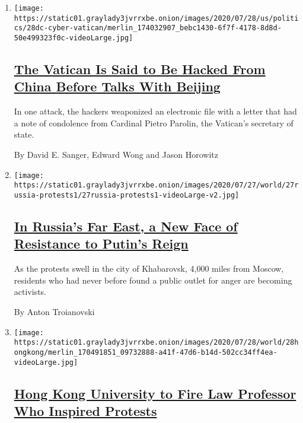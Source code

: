 \begin{enumerate}
\def\labelenumi{\arabic{enumi}.}
\item
  \texttt{[image: https://static01.graylady3jvrrxbe.onion/images/2020/07/28/us/politics/28dc-cyber-vatican/merlin\_174032907\_bebc1430-6f7f-4178-8d8d-50e499323f0c-videoLarge.jpg]}

  \hypertarget{the-vatican-is-said-to-be-hacked-from-china-before-talks-with-beijing}{%
  \subsection{\texorpdfstring{\href{/2020/07/28/us/politics/china-vatican-hack.html}{The
  Vatican Is Said to Be Hacked From China Before Talks With
  Beijing}}{The Vatican Is Said to Be Hacked From China Before Talks With Beijing}}\label{the-vatican-is-said-to-be-hacked-from-china-before-talks-with-beijing}}

  In one attack, the hackers weaponized an electronic file with a letter
  that had a note of condolence from Cardinal Pietro Parolin, the
  Vatican's secretary of state.

  By David E. Sanger, Edward Wong and Jason Horowitz
\item
  \texttt{[image: https://static01.graylady3jvrrxbe.onion/images/2020/07/27/world/27russia-protests1/27russia-protests1-videoLarge-v2.jpg]}

  \hypertarget{in-russias-far-east-a-new-face-of-resistance-to-putins-reign}{%
  \subsection{\texorpdfstring{\href{/2020/07/28/world/europe/russias-far-east-protests-putin.html}{In
  Russia's Far East, a New Face of Resistance to Putin's
  Reign}}{In Russia's Far East, a New Face of Resistance to Putin's Reign}}\label{in-russias-far-east-a-new-face-of-resistance-to-putins-reign}}

  As the protests swell in the city of Khabarovsk, 4,000 miles from
  Moscow, residents who had never before found a public outlet for anger
  are becoming activists.

  By Anton Troianovski
\item
  \texttt{[image: https://static01.graylady3jvrrxbe.onion/images/2020/07/28/world/28hongkong/merlin\_170491851\_09732888-a41f-47d6-b14d-502cc34ff4ea-videoLarge.jpg]}

  \hypertarget{hong-kong-university-to-fire-law-professor-who-inspired-protests}{%
  \subsection{\texorpdfstring{\href{/2020/07/28/world/asia/benny-tai-hong-kong-university.html}{Hong
  Kong University to Fire Law Professor Who Inspired
  Protests}}{Hong Kong University to Fire Law Professor Who Inspired Protests}}\label{hong-kong-university-to-fire-law-professor-who-inspired-protests}}


\end{enumerate}

